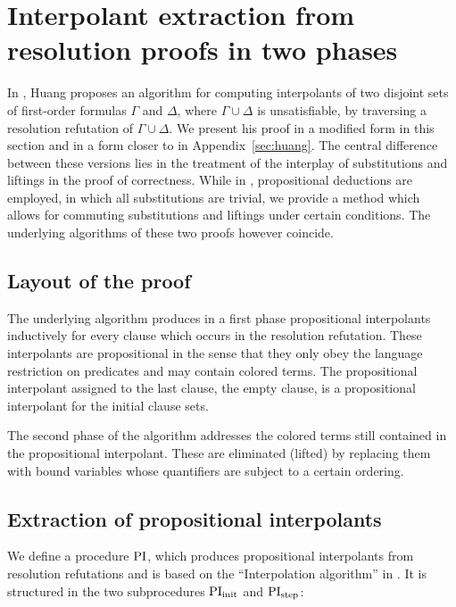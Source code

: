 \chapter{Interpolant extraction from resolution proofs in two phases}
\label{sec:two_phases}
\label{chap:two_phases}

In \cite{Huang95}, Huang proposes an algorithm for computing interpolants of two disjoint sets of first-order formulas $\Gamma$ and $\Delta$, where $\Gamma\cup\Delta$ is unsatisfiable, by traversing a resolution refutation of $\Gamma \cup \Delta$.
We present his proof in a modified form in this section and in a form closer to \cite{Huang95} in Appendix~\ref{sec:huang}.
The central difference between these versions lies in the treatment of the interplay of substitutions and liftings in the proof of correctness.
While in \cite{Huang95}, propositional deductions are employed, in which all substitutions are trivial,
we provide a method which allows for commuting substitutions and liftings under certain conditions.
The underlying algorithms of these\nolinebreak{} two\nolinebreak{} proofs\nolinebreak{} however\nolinebreak{} coincide.

\section{Layout of the proof}

The underlying algorithm produces in a first phase propositional interpolants inductively for every clause which occurs in the resolution refutation.
These interpolants are propositional in the sense that they only obey the language restriction on predicates and may contain colored terms.
The propositional interpolant assigned to the last clause, the empty clause, is a propositional interpolant for the initial clause sets.

The second phase of the algorithm addresses the colored terms still contained in the propositional interpolant.
These are eliminated (lifted) by replacing them with bound variables whose quantifiers are subject to a certain ordering.



\section{Extraction of propositional interpolants}

We define a procedure $\operatorname{PI}$, which produces propositional interpolants from resolution refutations and is based on the ``Interpolation algorithm'' in \cite{Huang95}.
It is structured in the two subprocedures $\operatorname{PI}_{\mathrm{init}}$ and $\operatorname{PI}_{\mathrm{step}}$:

